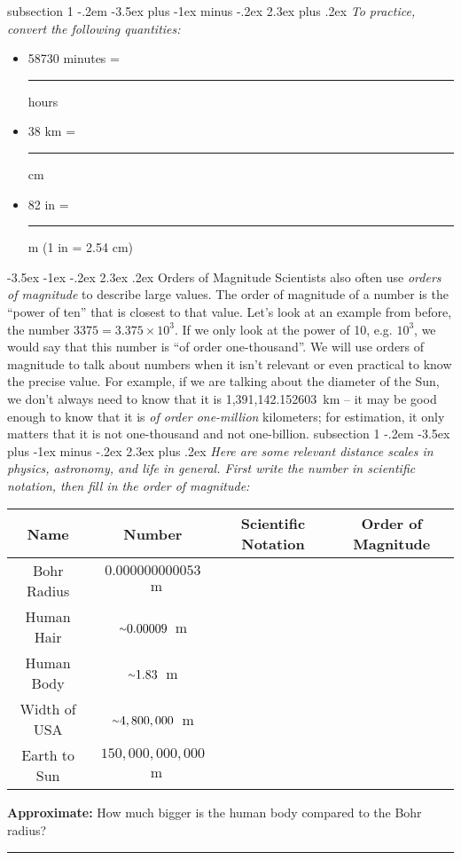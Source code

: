 \documentclass[12pt]{article}
\makeatletter
\newcommand{\apwsim}{\raisebox{0.2ex}{\scriptsize$\sim$\normalsize}}
\newenvironment{problem}{\@startsection
       {subsection}
       {1}
       {-.2em}
       {-3.5ex plus -1ex minus -.2ex}
       {2.3ex plus .2ex}
       {\pagebreak[3]%
       \normalsize\bf\noindent{Problem }
       }
       }
       {%
       }
\renewcommand\section{\@startsection{section}{1}{\z@}%
                                  {-3.5ex \@plus -1ex \@minus -.2ex}%
                                  {2.3ex \@plus.2ex}%
                                  {\normalfont\large\bfseries}}
\makeatother
\begin{document}
\begin{problem}{ }
	\emph{To practice, convert the following quantities:}
	\begin{itemize}
	\item{58730} minutes =  \rule{2cm}{0.75pt} hours
	\item{38} km =  \rule{2cm}{0.75pt} cm
	\item{82} in =  \rule{2cm}{0.75pt} m (1 in = 2.54 cm)
	\end{itemize}
\end{problem}

%
%
\section{Orders of Magnitude}
\indent\indent Scientists also often use \emph{orders of magnitude} to describe large values. The order of magnitude of a number is the ``power of ten'' that is closest to that value. Let's look at an example from before, the number $3375 = 3.375\times10^3$. If we only look at the power of 10, e.g. $10^3$, we would say that this number is ``of order one-thousand''. We will use orders of magnitude to talk about numbers when it isn't relevant or even practical to know the precise value. For example, if we are talking about the diameter of the Sun, we don't always need to know that it is 1,391,142.152603~km -- it may be good enough to know that it is \emph{of order one-million} kilometers; for estimation, it only matters that it is not one-thousand and not one-billion.
\clearpage
\begin{problem}{ }
\emph{Here are some relevant distance scales in physics, astronomy, and life in general. First write the number in scientific notation, then fill in the order of magnitude:}
\begin{center}
	\def\arraystretch{1.5}
	\begin{tabular}{| c | c | c | c |}
		\hline
		\textbf{Name} & \textbf{Number} & \textbf{Scientific Notation} & \textbf{Order of Magnitude} \\ \hline 
		Bohr Radius & $0.000000000053$~m &  &  \\ \hline 
		Human Hair & $\apwsim0.00009$~m &  &  \\ \hline 
		Human Body & $\apwsim1.83$~m &  &  \\ \hline 
		Width of USA & $\apwsim4,800,000$~m &  &  \\ \hline
		Earth to Sun & $150,000,000,000$~m &  &  \\ \hline
	\end{tabular}\linebreak\linebreak
	
	\noindent\textbf{Approximate:} How much bigger is the human body compared to the Bohr radius?\linebreak\linebreak\linebreak
	 \rule{15cm}{0.75pt}\linebreak
	 
\end{center}
\end{problem}
\end{document}
